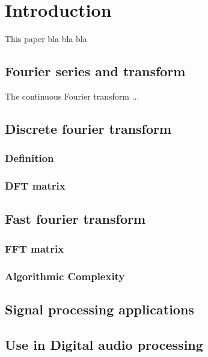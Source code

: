 \section{Introduction}
This paper bla bla bla

\subsection{Fourier series and transform}
The continuous Fourier transform ...
\subsection{Discrete fourier transform}
\subsubsection{Definition}
\subsubsection{DFT matrix}

\subsection{Fast fourier transform}
\subsubsection{FFT matrix}
\subsubsection{Algorithmic Complexity}

\subsection{Signal processing applications}

\subsection{Use in Digital audio processing}

